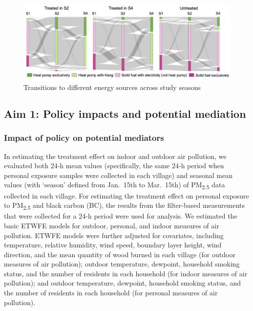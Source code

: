 \documentclass[
  letterpaper,
  DIV=11,
  numbers=noendperiod]{scrartcl}
\begin{document}
\begin{figure}[H]

{\centering \includegraphics[width=1\textwidth,height=\textheight]{images/sankey.png}

}

\caption{\label{fig-sankey}Transitions to different energy sources
across study seasons}

\end{figure}

\hypertarget{aim-1-policy-impacts-and-potential-mediation}{%
\subsection{Aim 1: Policy impacts and potential
mediation}\label{aim-1-policy-impacts-and-potential-mediation}}

\hypertarget{impact-of-policy-on-potential-mediators}{%
\subsubsection{Impact of policy on potential
mediators}\label{impact-of-policy-on-potential-mediators}}

In estimating the treatment effect on indoor and outdoor air pollution,
we evaluated both 24-h mean values (specifically, the same 24-h period
when personal exposure samples were collected in each village) and
seasonal mean values (with `season' defined from Jan.~15th to Mar.~15th)
of PM\textsubscript{2.5} data collected in each village. For estimating
the treatment effect on personal exposure to PM\textsubscript{2.5} and
black carbon (BC), the results from the filter-based measurements that
were collected for a 24-h period were used for analysis. We estimated
the basic ETWFE models for outdoor, personal, and indoor measures of air
pollution. ETWFE models were further adjusted for covariates, including
temperature, relative humidity, wind speed, boundary layer height, wind
direction, and the mean quantity of wood burned in each village (for
outdoor measures of air pollution); outdoor temperature, dewpoint,
household smoking status, and the number of residents in each household
(for indoor measures of air pollution); and outdoor temperature,
dewpoint, household smoking status, and the number of residents in each
household (for personal measures of air pollution).
\end{document}
